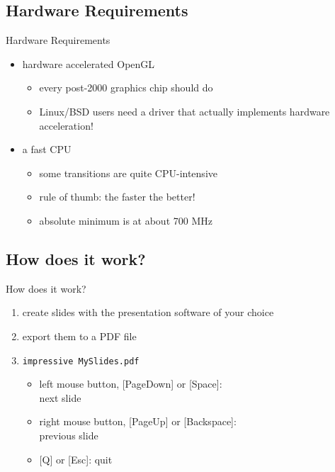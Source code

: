 \documentclass[bigger,hyperref={colorlinks=true,linkcolor=white,urlcolor=blue}]{beamer}
\begin{document}
\subsection{Hardware Requirements}
\begin{frame}{Hardware Requirements}
    \begin{itemize}
        \item hardware accelerated OpenGL
            \begin{itemize}
                \item every post-2000 graphics chip should do
                \item Linux/BSD users need a driver that actually implements
                      hardware acceleration!
            \end{itemize}
        \item a fast CPU
            \begin{itemize}
                \item some transitions are quite CPU-intensive
                \item rule of thumb: the faster the better!
                \item absolute minimum is at about 700 MHz
            \end{itemize}
    \end{itemize}
\end{frame}

\subsection{How does it work?}
\begin{frame}{How does it work?}
    \begin{enumerate}
        \item create slides with the presentation software of your choice
        \item export them to a PDF file
        \item \texttt{impressive MySlides.pdf}
            \begin{itemize}
                \item left mouse button, [PageDown] or [Space]: \\
                      next slide
                \item right mouse button, [PageUp] or [Backspace]: \\
                      previous slide
                \item {}[Q] or [Esc]: quit
            \end{itemize}
    \end{enumerate}
\end{frame}
\end{document}
